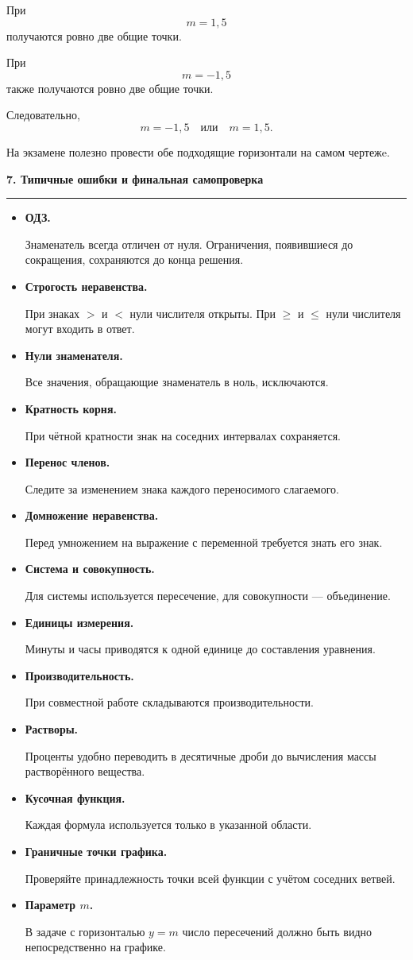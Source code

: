 \documentclass[a4paper,12pt]{article}
\newcommand{\topic}[1]{%
  \vspace{0.8em}%
  {\Large\bfseries\color{darkaccent}#1}\par
  \vspace{0.25em}%
  {\color{accent}\rule{\linewidth}{0.6pt}}\par
  \vspace{0.45em}%
}
\newcommand{\key}[1]{%
  \textbf{\color{darkaccent}#1}%
}
\begin{document}
При
\[
m=1{,}5
\]
получаются ровно две общие точки.

При
\[
m=-1{,}5
\]
также получаются ровно две общие точки.

Следовательно,
\[
\boxed{m=-1{,}5\quad\text{или}\quad m=1{,}5}.
\]

На экзамене полезно провести обе подходящие горизонтали на самом
чертежe.


\topic{7. Типичные ошибки и финальная самопроверка}

\begin{itemize}

  \item
  \key{ОДЗ.}
  Знаменатель всегда отличен от нуля. Ограничения, появившиеся до
  сокращения, сохраняются до конца решения.

  \item
  \key{Строгость неравенства.}
  При знаках \(>\) и \(<\) нули числителя открыты.
  При \(\ge\) и \(\le\) нули числителя могут входить в ответ.

  \item
  \key{Нули знаменателя.}
  Все значения, обращающие знаменатель в ноль, исключаются.

  \item
  \key{Кратность корня.}
  При чётной кратности знак на соседних интервалах сохраняется.

  \item
  \key{Перенос членов.}
  Следите за изменением знака каждого переносимого слагаемого.

  \item
  \key{Домножение неравенства.}
  Перед умножением на выражение с переменной требуется знать его знак.

  \item
  \key{Система и совокупность.}
  Для системы используется пересечение, для совокупности --- объединение.

  \item
  \key{Единицы измерения.}
  Минуты и часы приводятся к одной единице до составления уравнения.

  \item
  \key{Производительность.}
  При совместной работе складываются производительности.

  \item
  \key{Растворы.}
  Проценты удобно переводить в десятичные дроби до вычисления массы
  растворённого вещества.

  \item
  \key{Кусочная функция.}
  Каждая формула используется только в указанной области.

  \item
  \key{Граничные точки графика.}
  Проверяйте принадлежность точки всей функции с учётом соседних ветвей.

  \item
  \key{Параметр \(m\).}
  В задаче с горизонталью \(y=m\) число пересечений должно быть видно
  непосредственно на графике.

\end{itemize}
\end{document}
